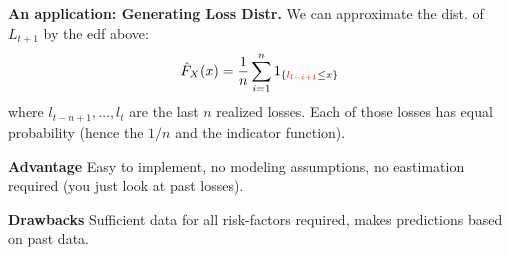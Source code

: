 \textbf{An application: Generating Loss Distr.}
We can approximate the dist. of $L_{t+1}$ by the edf above:
\[
  \hat{F}_X(x) = \frac{1}{n} \sum_{i=1}^n 1_{\{\textcolor{red}{l_{l-i+1}}
  \leq x\}}
\]
where $l_{t-n+1}, \dots, l_t$ are the last $n$ realized losses. Each of those
losses has equal probability (hence the $1/n$ and the indicator function).

\textbf{Advantage} Easy to implement, no modeling assumptions, no eastimation
required (you just look at past losses).

\textbf{Drawbacks} Sufficient data for all risk-factors required, makes
predictions based on past data.









